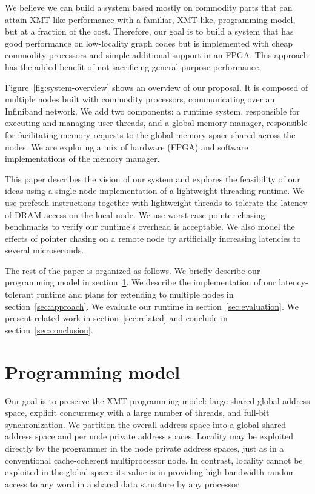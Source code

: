 \documentclass[10pt,nocopyrightspace,preprint]{sigplanconf}
\begin{document}
We believe we can build a system based mostly on commodity parts that
can attain XMT-like performance with a familiar, XMT-like,
programming model, but at a fraction of the cost. Therefore, our goal
is to build a system that has good performance on low-locality graph
codes but is implemented with cheap commodity processors and simple
additional support in an FPGA. This approach has the added
benefit of not sacrificing general-purpose performance.

Figure~\ref{fig:system-overview} shows an overview of our proposal. It
is composed of multiple nodes built with commodity processors,
communicating over an Infiniband network. We add two components: a
runtime system, responsible for executing and managing user threads,
and a global memory manager, responsible for facilitating memory
requests to the global memory space shared across the nodes.
We are exploring a mix of hardware (FPGA) and software implementations
of the memory manager.
 
This paper describes the vision of our system and explores the
feasibility of our ideas using a single-node implementation of a
lightweight threading runtime. We use prefetch instructions together
with lightweight threads to tolerate the latency of DRAM access on the
local node. We use worst-case pointer chasing benchmarks to
verify our runtime's overhead is acceptable. We also model the effects
of pointer chasing on a remote node by artificially increasing
latencies to several microseconds.
 
The rest of the paper is organized as follows. We briefly describe our
programming model in section~\ref{sec:model}. We describe the
implementation of our latency-tolerant runtime and plans for extending
to multiple nodes in section~\ref{sec:approach}. We evaluate our
runtime in section~\ref{sec:evaluation}.  We present related work in
section~\ref{sec:related} and conclude in
section~\ref{sec:conclusion}.


\section{Programming model}
\label{sec:model}

Our goal is to preserve the XMT programming model: large shared global
address space, explicit concurrency with a large number of threads,
and full-bit synchronization.  We partition the overall address
space into a global shared address space and per node private address
spaces. Locality may be exploited directly by the programmer in the
node private address spaces, just as in a conventional cache-coherent
multiprocessor node. In contrast, locality cannot be exploited in the
global space: its value is in providing high bandwidth random access
to any word in a shared data structure by any processor.
\end{document}
